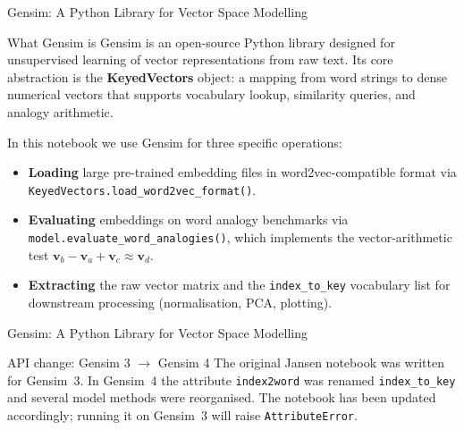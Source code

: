 \documentclass[11pt,aspectratio=169,professionalfonts]{beamer}
\begin{document}
%
%
\begin{frame}{Gensim: A Python Library for Vector Space Modelling}
\small
\begin{block}{What Gensim is}
  Gensim is an open-source Python library designed for unsupervised learning
  of vector representations from raw text. Its core abstraction is the
  \textbf{KeyedVectors} object: a mapping from word strings to dense numerical
  vectors that supports vocabulary lookup, similarity queries, and analogy
  arithmetic.
\end{block}

\medskip
In this notebook we use Gensim for three specific operations:

\begin{itemize}
  \item \textbf{Loading} large pre-trained embedding files in word2vec-compatible
        format via \texttt{KeyedVectors.load\_word2vec\_format()}.
  \item \textbf{Evaluating} embeddings on word analogy benchmarks via
        \texttt{model.evaluate\_word\_analogies()}, which implements the
        vector-arithmetic test $\mathbf{v}_b - \mathbf{v}_a + \mathbf{v}_c \approx \mathbf{v}_d$.
  \item \textbf{Extracting} the raw vector matrix and the \texttt{index\_to\_key}
        vocabulary list for downstream processing (normalisation, PCA, plotting).
\end{itemize}
\end{frame}
%
%
\begin{frame}{Gensim: A Python Library for Vector Space Modelling}
\begin{alertblock}{API change: Gensim 3 $\to$ Gensim 4}
  The original Jansen notebook was written for Gensim~3. In Gensim~4 the
  attribute \texttt{index2word} was renamed \texttt{index\_to\_key} and
  several model methods were reorganised. The notebook has been updated
  accordingly; running it on Gensim~3 will raise \texttt{AttributeError}.
\end{alertblock}

\end{frame}
%
%
\end{document}
